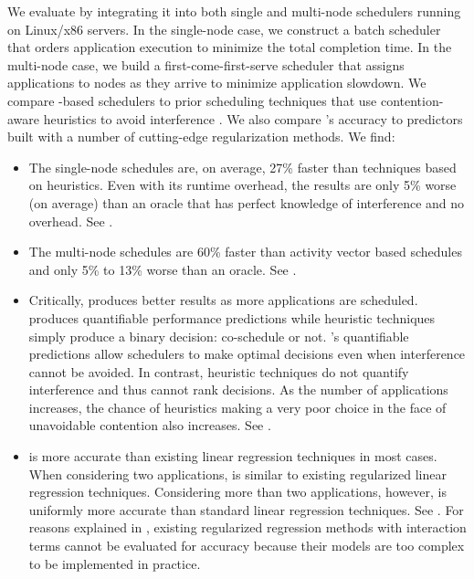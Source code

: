 We evaluate \SYSTEM{} by integrating it into both single and
multi-node schedulers running on Linux/x86 servers.  In the
single-node case, we construct a batch scheduler that orders
application execution to minimize the total completion time.  In the
multi-node case, we build a first-come-first-serve scheduler that
assigns applications to nodes as they arrive to minimize application
slowdown.  We compare \SYSTEM{}-based schedulers to prior scheduling
techniques that use contention-aware heuristics to avoid interference
\cite{resense,merkel2010resource,Merlin}.  We also compare \SYSTEM{}'s
accuracy to predictors built with a number of cutting-edge
regularization methods. We find:
\begin{itemize}
\item The single-node \SYSTEM{} schedules are, on average, 27\% faster
  than techniques based on heuristics.  Even with its runtime
  overhead, the \SYSTEM{} results are only 5\% worse (on average) than
  an oracle that has perfect knowledge of interference and no
  overhead. See .
\item The multi-node \SYSTEM{} schedules are 60\% faster than activity
  vector based schedules and only 5\% to 13\% worse than an oracle.
  See .
\item Critically, \SYSTEM{} produces better results as more
  applications are scheduled.  \SYSTEM{} produces quantifiable
  performance predictions while heuristic techniques simply produce a
  binary decision: co-schedule or not.  \SYSTEM{}'s quantifiable
  predictions allow schedulers to make optimal decisions even when
  interference cannot be avoided. In contrast, heuristic techniques do
  not quantify interference and thus cannot rank decisions.  As the
  number of applications increases, the chance of heuristics making a
  very poor choice in the face of unavoidable contention also
  increases.  See .
\item \SYSTEM{} is more accurate than existing linear regression
  techniques in most cases.  When considering two applications,
  \SYSTEM{} is similar to existing regularized linear regression
  techniques.  Considering more than two applications, however,
  \SYSTEM{} is uniformly more accurate than standard linear regression
  techniques.  See .  For reasons explained in
  , existing regularized regression methods with
  interaction terms cannot be evaluated for accuracy because their
  models are too complex to be implemented in practice.
\end{itemize}

